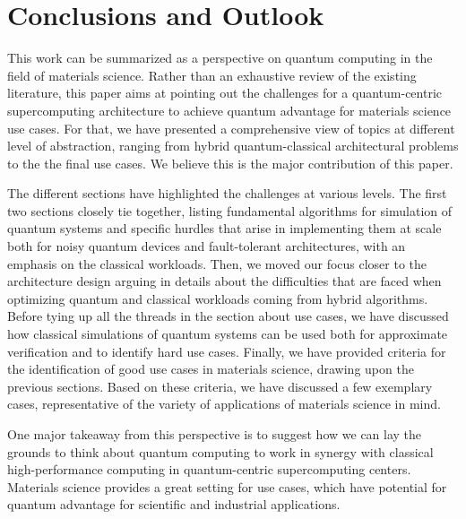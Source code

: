 \section{Conclusions and Outlook\label{sec:conclusion_outlook}}

This work can be summarized as a perspective on quantum computing in the field of materials science. Rather than an exhaustive review of the existing literature, this paper aims at pointing out the challenges for a quantum-centric supercomputing architecture to achieve quantum advantage for materials science use cases. For that, we have presented a comprehensive view of topics at different level of abstraction, ranging from hybrid quantum-classical architectural problems to the the final use cases. We believe this is the major contribution of this paper.

The different sections have highlighted the challenges at various levels. The first two sections closely tie together, listing fundamental algorithms for simulation of quantum systems and specific hurdles that arise in implementing them at scale both for noisy quantum devices and fault-tolerant architectures, with an emphasis on the classical workloads. Then, we moved our focus closer to the architecture design arguing in details about the difficulties that are faced when optimizing quantum and classical workloads coming from hybrid algorithms. Before tying up all the threads in the section about use cases, we have discussed how classical simulations of quantum systems can be used both for approximate verification and to identify hard use cases. Finally, we have provided criteria for the identification of good use cases in materials science, drawing upon the previous sections. Based on these criteria, we have discussed a few exemplary cases, representative of the variety of applications of materials science in mind.   

One major takeaway from this perspective is to suggest how we can lay the grounds to think about quantum computing to work in synergy with classical high-performance computing in quantum-centric supercomputing centers. Materials science provides a great setting for use cases, which have potential for quantum advantage for scientific and industrial applications. 